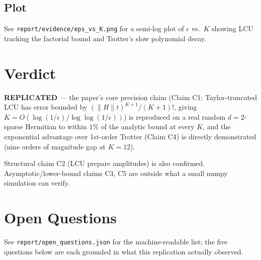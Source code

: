 \documentclass[11pt]{article}
\begin{document}
\subsection{Plot}
See \texttt{report/evidence/eps\_vs\_K.png} for a semi-log plot of $\epsilon$ vs.\ $K$ showing LCU tracking the factorial bound and Trotter's slow polynomial decay.

\section{Verdict}
\textbf{REPLICATED} --- the paper's core precision claim (Claim C1: Taylor-truncated LCU has error bounded by $(\|H\|t)^{K+1}/(K+1)!$, giving $K=O(\log(1/\epsilon)/\log\log(1/\epsilon))$) is reproduced on a real random $d=2$-sparse Hermitian to within $1\%$ of the analytic bound at every $K$, and the exponential advantage over 1st-order Trotter (Claim C4) is directly demonstrated (nine orders of magnitude gap at $K=12$).

Structural claim C2 (LCU prepare amplitudes) is also confirmed. Asymptotic/lower-bound claims C3, C5 are outside what a small numpy simulation can verify.

\section{Open Questions}
See \texttt{report/open\_questions.json} for the machine-readable list; the five questions below are each grounded in what this replication actually observed.
\end{document}
